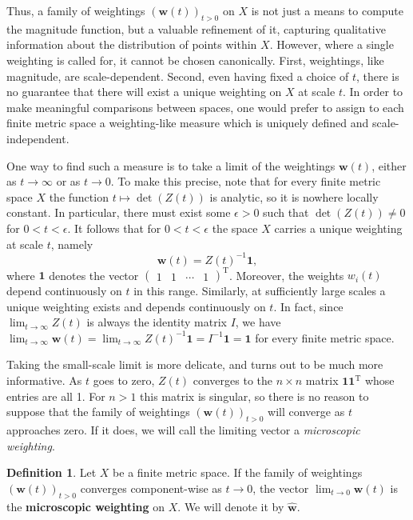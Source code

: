 \documentclass[a4paper, oneside, reqno]{amsart}
\theoremstyle{definition}
\newtheorem{definition}[theorem]{Definition}
\theoremstyle{remark}
\numberwithin{equation}{section}
\renewcommand{\vec}{\mathbf}
\newcommand{\onevector}{\mathbf{1}}
\newcommand{\onematrix}{\onevector \onevector^\transpose}
\newcommand{\transpose}{\mathrm{T}}
\newcommand{\define}{\textbf}
\newcommand{\micro}{\widehat{\vec{w}}}
\begin{document}
Thus, a family of weightings \((\vec{w}(t))_{t > 0}\) on \(X\) is not just a means to compute the magnitude function, but a valuable refinement of it, capturing qualitative information about the distribution of points within \(X\). However, where a single weighting is called for, it cannot be chosen canonically. First, weightings, like magnitude, are scale-dependent. Second, even having fixed a choice of \(t\), there is no guarantee that there will exist a unique weighting on \(X\) at scale \(t\). In order to make meaningful comparisons between spaces, one would prefer to assign to each finite metric space a weighting-like measure which is uniquely defined and scale-independent.

One way to find such a measure is to take a limit of the weightings \(\vec{w}(t)\), either as \(t \to \infty\) or as \(t \to 0\). To make this precise, note that for every finite metric space \(X\) the function \(t \mapsto \det(Z(t))\) is analytic, so it is nowhere locally constant. In particular, there must exist some \(\epsilon > 0\) such that \(\det(Z(t)) \neq 0\) for \(0 < t < \epsilon\). 
It follows that for \(0 < t < \epsilon\) the space \(X\) carries a unique weighting at scale \(t\), namely
\[
\vec{w}(t) = Z(t)^{-1} \onevector,
\]
where \(\onevector\) denotes the vector \(\begin{pmatrix} 1 & 1 & \cdots & 1 \end{pmatrix}^\transpose\). Moreover, the weights \(w_i(t)\) depend continuously on \(t\) in this range.  Similarly, at sufficiently large scales a unique weighting exists and depends continuously on \(t\). In fact, since \(\lim_{t \to \infty} Z(t)\) is always the identity matrix \(I\), we have
\(
\lim_{t \to \infty} \vec{w}(t) = \lim_{t \to \infty} Z(t)^{-1} \onevector = I^{-1} \onevector = \onevector
\)
for every finite metric space. 

Taking the small-scale limit is more delicate, and turns out to be much more informative. As \(t\) goes to zero, \(Z(t)\) converges to the \(n \times n\) matrix \(\onematrix\) whose entries are all 1. For \(n>1\) this matrix is singular, so there is no reason to suppose that the family of weightings \((\vec{w}(t))_{t > 0}\) will converge as \(t\) approaches zero. If it does, we will call the limiting vector a \emph{microscopic weighting}.

\begin{definition}
    Let \(X\) be a finite metric space. If the family of weightings \((\vec{w}(t))_{t > 0}\) converges component-wise as \(t \to 0\), the vector \(\lim_{t \to 0} \vec{w}(t)\) is the \define{microscopic weighting} on \(X\). We will denote it by \(\micro\).
\end{definition}
\end{document}
